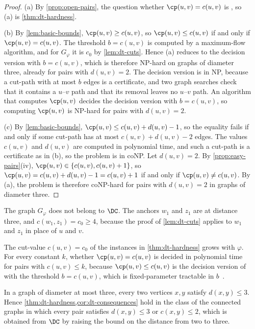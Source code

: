 \begin{proof}
(a) By \cref{prop:open-pairs}, the question whether $\cp(u, v) = c(u, v)$ is \PathInMinCut{}, so (a) is \cref{thm:dt-hardness}.

(b) By \cref{lem:basic-bounds}, $\cp(u, v) \geq c(u, v)$, so $\cp(u, v) \leq c(u, v)$ if and only if $\cp(u, v) = c(u, v)$.
The threshold $b = c(u, v)$ is computed by a maximum-flow algorithm, and for $G_\varphi$ it is $c_0$ by \cref{lem:dt-cuts}.
Hence (a) reduces to the decision version with $b = c(u, v)$, which is therefore NP-hard on graphs of diameter three, already for pairs with $d(u, v) = 2$.
The decision version is in NP, because a cut-path with at most $b$ edges is a certificate, and two graph searches check that it contains a $u$--$v$ path and that its removal leaves no $u$--$v$ path.
An algorithm that computes $\cp(u, v)$ decides the decision version with $b = c(u, v)$, so computing $\cp(u, v)$ is NP-hard for pairs with $d(u, v) = 2$.

(c) By \cref{lem:basic-bounds}, $\cp(u, v) \leq c(u, v) + d(u, v) - 1$, so the equality fails if and only if some cut-path has at most $c(u, v) + d(u, v) - 2$ edges.
The values $c(u, v)$ and $d(u, v)$ are computed in polynomial time, and such a cut-path is a certificate as in (b), so the problem is in coNP.
Let $d(u, v) = 2$.
By \cref{prop:easy-pairs}(iv), $\cp(u, v) \in \{c(u, v), c(u, v) + 1\}$, so $\cp(u, v) = c(u, v) + d(u, v) - 1 = c(u, v) + 1$ if and only if $\cp(u, v) \neq c(u, v)$.
By (a), the problem is therefore coNP-hard for pairs with $d(u, v) = 2$ in graphs of diameter three.
\end{proof}

\begin{remark}
\label{rem:dt-not-in-dc}
The graph $G_\varphi$ does not belong to $\DC$.
The anchors $w_1$ and $z_1$ are at distance three, and $c(w_1, z_1) = c_0 \geq 4$, because the proof of \cref{lem:dt-cuts} applies to $w_1$ and $z_1$ in place of $u$ and $v$.
\end{remark}

\begin{remark}
\label{rem:dt-bounded-cut-value}
The cut-value $c(u, v) = c_0$ of the instances in \cref{thm:dt-hardness} grows with $\varphi$.
For every constant $k$, whether $\cp(u, v) = c(u, v)$ is decided in polynomial time for pairs with $c(u, v) \leq k$, because $\cp(u, v) \leq c(u, v)$ is the decision version of \MinCutPath{} with the threshold $b = c(u, v)$, which is fixed-parameter tractable in $b$~\cite[Theorem~8.4]{Michel2026MinCutPath}.
\end{remark}

\begin{remark}
\label{rem:dt-shifted-class}
In a graph of diameter at most three, every two vertices $x, y$ satisfy $d(x, y) \leq 3$.
Hence \cref{thm:dt-hardness,cor:dt-consequences} hold in the class of the connected graphs in which every pair satisfies $d(x, y) \leq 3$ or $c(x, y) \leq 2$, which is obtained from $\DC$ by raising the bound on the distance from two to three.
\end{remark}


